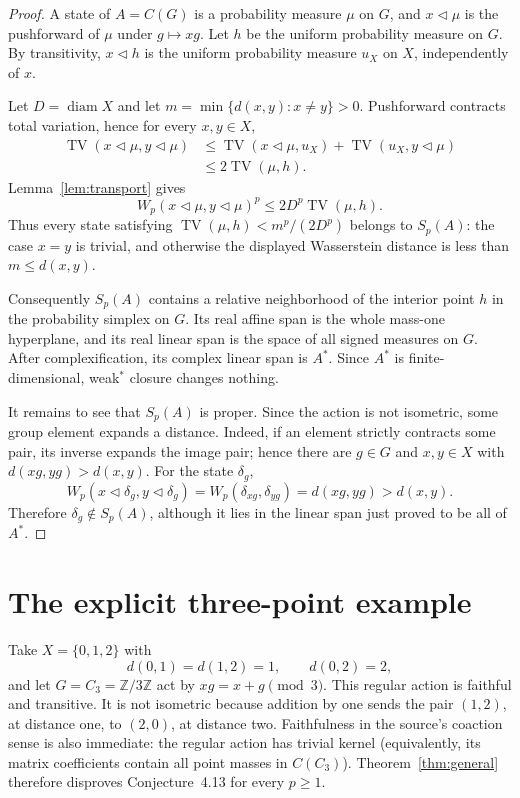 \documentclass[11pt]{article}
\newcommand{\TV}{\operatorname{TV}}
\begin{document}
\begin{proof}
A state of $A=C(G)$ is a probability measure $\mu$ on $G$, and
$x\mathbin{\triangleleft}\mu$ is the pushforward of $\mu$ under
$g\mapsto xg$.  Let $h$ be the uniform probability measure on $G$.  By
transitivity, $x\mathbin{\triangleleft}h$ is the uniform probability measure
$u_X$ on $X$, independently of $x$.

Let $D=\operatorname{diam}X$ and let
$m=\min\{d(x,y):x\ne y\}>0$.  Pushforward contracts total variation, hence
for every $x,y\in X$,
\begin{align*}
 \TV(x\mathbin{\triangleleft}\mu,
       y\mathbin{\triangleleft}\mu)
 &\leq \TV(x\mathbin{\triangleleft}\mu,u_X)
       +\TV(u_X,y\mathbin{\triangleleft}\mu)\\
 &\leq 2\TV(\mu,h).
\end{align*}
Lemma~\ref{lem:transport} gives
\[
 W_p(x\mathbin{\triangleleft}\mu,
       y\mathbin{\triangleleft}\mu)^p
 \leq 2D^p\TV(\mu,h).
\]
Thus every state satisfying
$\TV(\mu,h)<m^p/(2D^p)$ belongs to $S_p(A)$: the case $x=y$ is trivial,
and otherwise the displayed Wasserstein distance is less than
$m\leq d(x,y)$.

Consequently $S_p(A)$ contains a relative neighborhood of the interior point
$h$ in the probability simplex on $G$.  Its real affine span is the whole
mass-one hyperplane, and its real linear span is the space of all signed
measures on $G$.  After complexification, its complex linear span is $A^*$.
Since $A^*$ is finite-dimensional, weak$^*$ closure changes nothing.

It remains to see that $S_p(A)$ is proper.  Since the action is not
isometric, some group element expands a distance.  Indeed, if an element
strictly contracts some pair, its inverse expands the image pair; hence there
are $g\in G$ and $x,y\in X$ with
$d(xg,yg)>d(x,y)$.  For the state $\delta_g$,
\[
 W_p(x\mathbin{\triangleleft}\delta_g,
       y\mathbin{\triangleleft}\delta_g)
 =W_p(\delta_{xg},\delta_{yg})=d(xg,yg)>d(x,y).
\]
Therefore $\delta_g\notin S_p(A)$, although it lies in the linear span just
proved to be all of $A^*$.
\end{proof}

\section{The explicit three-point example}

Take $X=\{0,1,2\}$ with
\[
 d(0,1)=d(1,2)=1,\qquad d(0,2)=2,
\]
and let $G=C_3=\mathbb Z/3\mathbb Z$ act by
$xg=x+g\pmod 3$.  This regular action is faithful and transitive.  It is not
isometric because addition by one sends the pair $(1,2)$, at distance one,
to $(2,0)$, at distance two.  Faithfulness in the source's coaction sense is
also immediate: the regular action has trivial kernel (equivalently, its
matrix coefficients contain all point masses in $C(C_3)$).  Theorem~\ref{thm:general}
therefore disproves Conjecture~4.13 for every $p\geq1$.
\end{document}
